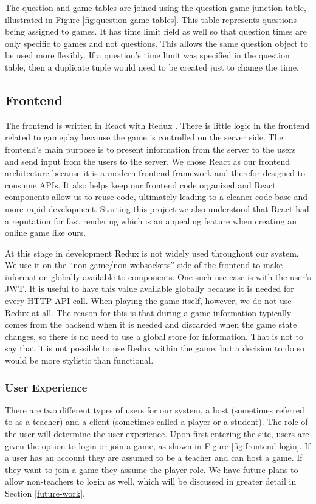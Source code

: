 \documentclass{article}
\begin{document}
    		The question and game tables are joined using the question-game junction table, illustrated in Figure \ref{fig:question-game-tables}. This table represents questions being assigned to games. It has time limit field as well so that question times are only specific to games and not questions. This allows the same question object to be used more flexibly. If a question's time limit was specified in the question table, then a duplicate tuple would need to be created just to change the time.

	\subsection{Frontend}
	    The frontend is written in React with Redux \cite{redux}. There is little logic in the frontend related to gameplay because the game is controlled on the server side. The frontend's main purpose is to present information from the server to the users and send input from the users to the server. We chose React as our frontend architecture because it is a modern frontend framework and therefor designed to consume APIs. It also helps keep our frontend code organized and React components allow us to reuse code, ultimately leading to a cleaner code base and more rapid development. Starting this project we also understood that React had a reputation for fast rendering which is an appealing feature when creating an online game like ours.
	    \smallskip
	    
	    At this stage in development Redux is not widely used throughout our system. We use it on the ``non game/non websockets'' side of the frontend to make information globally available to components. One such use case is with the user's JWT. It is useful to have this value available globally because it is needed for every HTTP API call. When playing the game itself, however, we do not use Redux at all. The reason for this is that during a game information typically comes from the backend when it is needed and discarded when the game state changes, so there is no need to use a global store for information. That is not to say that it is not possible to use Redux within the game, but a decision to do so would be more stylistic than functional.
	    
	    \subsubsection{User Experience} \label{ux}
	        There are two different types of users for our system, a host (sometimes referred to as a teacher) and a client (sometimes called a player or a student). The role of the user will determine the user experience. Upon first entering the site, users are given the option to login or join a game, as shown in Figure \ref{fig:frontend-login}. If a user has an account they are assumed to be a teacher and can host a game. If they want to join a game they assume the player role. We have future plans to allow non-teachers to login as well, which will be discussed in greater detail in Section \ref{future-work}.
	        
\end{document}
